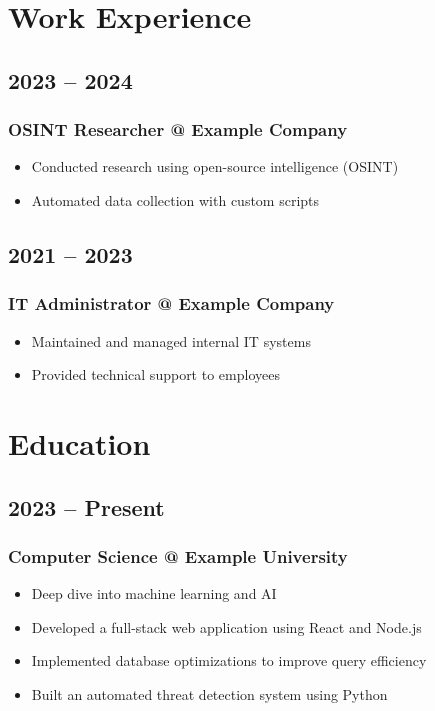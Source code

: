 \documentclass[a4paper,10pt]{article}
\begin{document}
\begin{minipage}[t][0.8\textheight]{0.6\textwidth} 
    \section*{Work Experience}
    \subsection{2023 – 2024}
    \subsubsection{OSINT Researcher @ Example Company}
    \begin{itemize}[noitemsep,topsep=0pt]
        \item Conducted research using open-source intelligence (OSINT)
        \item Automated data collection with custom scripts
    \end{itemize}
    \subsection{2021 – 2023} 
    \subsubsection{IT Administrator @ Example Company}
    \begin{itemize}[noitemsep,topsep=0pt]
        \item Maintained and managed internal IT systems
        \item Provided technical support to employees
    \end{itemize}
    \section*{Education}
    \subsection{2023 – Present} 
    \subsubsection{Computer Science @ Example University}
    \begin{itemize}[noitemsep,topsep=0pt]
        \item Deep dive into machine learning and AI
        \item Developed a full-stack web application using React and Node.js
        \item Implemented database optimizations to improve query efficiency
        \item Built an automated threat detection system using Python
    \end{itemize}
    \vspace{2mm}

\end{minipage}
\end{document}
